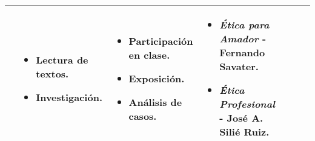 \begin{landscape}
\begin{adjustbox}{width=1.3847\textwidth}
\begin{tabular}{ | p{3cm} | p{5cm} | p{5cm} | p{3cm} | p{3cm} | p{3cm} | p{5cm} | }
\begin{minipage}
\begin{itemize}[leftmargin=10pt]
                \end{itemize}
            \end{minipage} &
            \begin{minipage}
                [t]{3cm}
                \begin{itemize}[leftmargin=10pt]
                    \item Lectura de textos.
                    \item Investigación.
                \end{itemize}
            \end{minipage} &
            \begin{minipage}
                [t]{3cm}
                \begin{itemize}[leftmargin=10pt]
                    \item Participación en clase.
                    \item Exposición.
                    \item Análisis de casos.
                \end{itemize}
            \end{minipage} &
            \begin{minipage}
                [t]{5cm}
                \begin{itemize}[leftmargin=10pt]
                    \item \textit{Ética para Amador} - Fernando Savater.
                    \item \textit{Ética Profesional} - José A. Silié Ruiz.
                \end{itemize}
            \end{minipage}                                                                                                                                                                                                        \\
            \hline
        \end{tabular}
    \end{adjustbox}
\end{landscape}